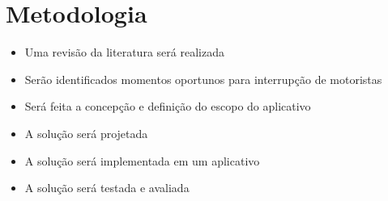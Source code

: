 \chapter{Metodologia}
\label{ref:metodologia}

\begin{itemize}
  \item Uma revisão da literatura será realizada
  \item Serão identificados momentos oportunos para interrupção de motoristas
  \item Será feita a concepção e definição do escopo do aplicativo
  \item A solução será projetada
  \item A solução será implementada em um aplicativo
  \item A solução será testada e avaliada
\end{itemize}
